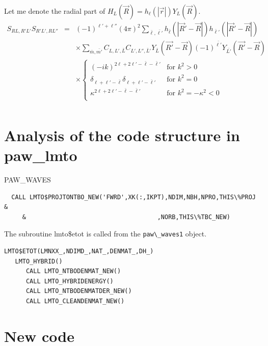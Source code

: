 \documentclass[11pt,a4paper]{report}
\begin{document}
Let me denote the radial part of
$H_L(\vec{R})=h_\ell(|\vec{r}|)Y_{L}(\vec{R})$.
\begin{eqnarray}
S_{RL,R'L'}S_{R'L',RL''}
&=&
(-1)^{\ell'+\ell''} (4\pi)^2 
\sum_{\bar{\ell},\bar{\ell'}} 
h_{\bar{\ell}}(|\vec{R}'-\vec{R}|)
h_{\bar{\ell}'}(|\vec{R}'-\vec{R}|)
\nonumber\\
&&\times\sum_{\bar{m},\bar{m'}}
C_{L,L',\bar{L}} C_{L',L'',\bar{L}'} 
Y_{\bar{L}}(\vec{R'}-\vec{R})
(-1)^{\bar{\ell'}} Y_{\bar{L'}}(\vec{R'}-\vec{R})
\nonumber\\
&&\times
\begin{cases}
(-ik)^{2\ell+2\ell'-\bar{\ell}-\bar{\ell}'}&\text{for $k^2>0$}\\
\delta_{\ell+\ell'-\bar{\ell}}\delta_{\ell+\ell'-\bar{\ell}'}
&\text{for $k^2=0$}\\
\kappa^{2\ell+2\ell'-\bar{\ell}-\bar{\ell}'}
&\text{for $k^2=-\kappa^2<0$}\\
\end{cases}
\nonumber\\
\end{eqnarray}

\section{Analysis of the code structure in paw\_lmto}


PAW\_WAVES
\begin{verbatim}
  CALL LMTO$PROJTONTBO_NEW('FWRD',XK(:,IKPT),NDIM,NBH,NPRO,THIS\%PROJ &
     &                                    ,NORB,THIS\%TBC_NEW)
\end{verbatim}



The subroutine lmto\$etot is called from the \verb|paw\_waves1| object. 
\begin{verbatim}
LMTO$ETOT(LMNXX_,NDIMD_,NAT_,DENMAT_,DH_)
   LMTO_HYBRID()
      CALL LMTO_NTBODENMAT_NEW() 
      CALL LMTO_HYBRIDENERGY()
      CALL LMTO_NTBODENMATDER_NEW()
      CALL LMTO_CLEANDENMAT_NEW()
\end{verbatim}

\section{New code}
\end{document}
